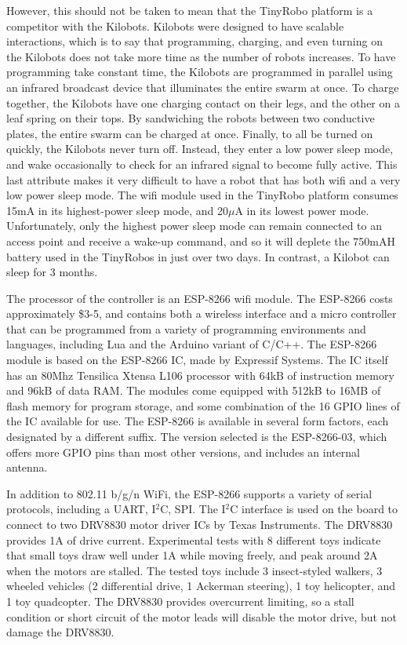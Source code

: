 However, this should not be taken to mean that the TinyRobo platform is a competitor with the Kilobots. 
Kilobots were designed to have scalable interactions, which is to say that programming, charging, and even turning on the Kilobots does not take more time as the number of robots increases. 
To have programming take constant time, the Kilobots are programmed in parallel using an infrared broadcast device that illuminates the entire swarm at once. 
To charge together, the Kilobots have one charging contact on their legs, and the other on a leaf spring on their tops. 
By sandwiching the robots between two conductive plates, the entire swarm can be charged at once.
Finally, to all be turned on quickly, the Kilobots never turn off.  
Instead, they enter a low power sleep mode, and wake occasionally to check for an infrared signal to become fully active. 
This last attribute makes it very difficult to have a robot that has both wifi and a very low power sleep mode. 
The wifi module used in the TinyRobo platform consumes 15mA in its highest-power sleep mode, and 20$\mu$A in its lowest power mode. 
Unfortunately, only the highest power sleep mode can remain connected to an access point and receive a wake-up command, and so it will deplete the 750mAH battery used in the TinyRobos in just over two days. 
In contrast, a Kilobot can sleep for 3 months. 

The processor of the controller is an ESP-8266 wifi module.
The ESP-8266 costs approximately \$3-5, and contains both a wireless interface and a micro controller that can be programmed from a variety of programming environments and languages, including Lua and the Arduino variant of C/C++. 
The ESP-8266 module is based on the ESP-8266 IC, made by Expressif Systems. The IC itself has an 80Mhz Tensilica Xtensa L106 processor with 64kB of instruction memory and 96kB of data RAM. The modules come equipped with 512kB to 16MB of flash memory for program storage, and some combination of the 16 GPIO lines of the IC available for use. 
The ESP-8266 is available in several form factors, each designated by a different suffix. 
The version selected is the ESP-8266-03, which offers more GPIO pins than most other versions, and includes an internal antenna.

In addition to 802.11 b/g/n WiFi, the ESP-8266 supports a variety of serial protocols, including a UART, I$^2$C, SPI. 
The I$^2$C interface is used on the board to connect to two DRV8830 motor driver ICs by Texas Instruments. 
The DRV8830 provides 1A of drive current.
Experimental tests with 8 different toys indicate that small toys draw well under 1A while moving freely, and peak around 2A when the motors are stalled. 
The tested toys include 3 insect-styled walkers, 3 wheeled vehicles (2 differential drive, 1 Ackerman steering), 1 toy helicopter, and 1 toy quadcopter.
The DRV8830 provides overcurrent limiting, so a stall condition or short circuit of the motor leads will disable the motor drive, but not damage the DRV8830. 

